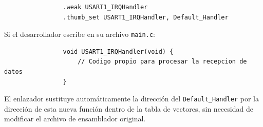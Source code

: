 \documentclass[../main.tex]{subfiles}
\begin{document}
            \begin{lstlisting}
                .weak USART1_IRQHandler
                .thumb_set USART1_IRQHandler, Default_Handler
            \end{lstlisting}

            Si el desarrollador escribe en su archivo \texttt{main.c}:

            \begin{lstlisting}
                void USART1_IRQHandler(void) {
                    // Codigo propio para procesar la recepcion de datos
                }
            \end{lstlisting}

            El enlazador sustituye automáticamente la dirección del \lstinline|Default_Handler| por la dirección de esta nueva función dentro de la tabla de vectores, sin necesidad de modificar el archivo de ensamblador original.
\end{document}
